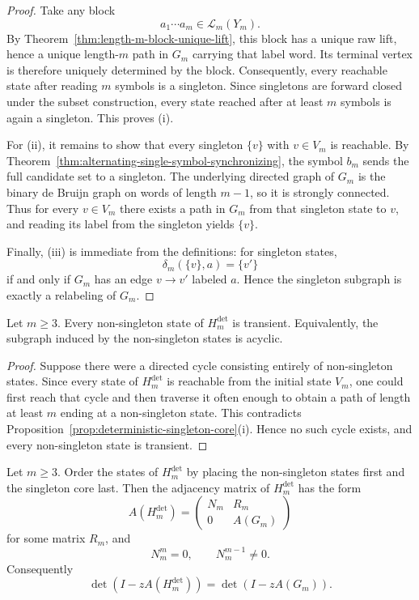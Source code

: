 \begin{proof}
Take any block
\[
a_1\cdots a_m\in\mathcal L_m(Y_m).
\]
By Theorem~\ref{thm:length-m-block-unique-lift}, this block has a unique raw
lift, hence a unique length-$m$ path in $G_m$ carrying that label word.  Its
terminal vertex is therefore uniquely determined by the block.  Consequently,
every reachable state after reading $m$ symbols is a singleton.  Since
singletons are forward closed under the subset construction, every state reached
after at least $m$ symbols is again a singleton.  This proves
\textup{(i)}.

For \textup{(ii)}, it remains to show that every singleton $\{v\}$ with
$v\in V_m$ is reachable.  By
Theorem~\ref{thm:alternating-single-symbol-synchronizing}, the symbol $b_m$
sends the full candidate set to a singleton.  The
underlying directed graph of $G_m$ is the binary de Bruijn graph on words of
length $m-1$, so it is strongly connected.  Thus for every $v\in V_m$ there
exists a path in $G_m$ from that singleton state to $v$, and reading its label
from the singleton yields $\{v\}$.

Finally, \textup{(iii)} is immediate from the definitions: for singleton states,
\[
\delta_m(\{v\},a)=\{v'\}
\]
if and only if $G_m$ has an edge $v\to v'$ labeled $a$.  Hence the singleton
subgraph is exactly a relabeling of $G_m$.
\end{proof}

\begin{proposition}
\label{prop:deterministic-ambiguity-transient}
Let $m\ge 3$.  Every non-singleton state of $H_m^{\mathrm{det}}$ is transient.
Equivalently, the subgraph induced by the non-singleton states is acyclic.
\end{proposition}

\begin{proof}
Suppose there were a directed cycle consisting entirely of non-singleton states.
Since every state of $H_m^{\mathrm{det}}$ is reachable from the initial state
$V_m$, one could first reach that cycle and then traverse it often enough to
obtain a path of length at least $m$ ending at a non-singleton state.  This
contradicts Proposition~\ref{prop:deterministic-singleton-core}\textup{(i)}.
Hence no such cycle exists, and every non-singleton state is transient.
\end{proof}

\begin{proposition}
\label{prop:ambiguity-shell-nilpotency}
Let $m\ge 3$.  Order the states of $H_m^{\mathrm{det}}$ by placing the
non-singleton states first and the singleton core last.  Then the adjacency
matrix of $H_m^{\mathrm{det}}$ has the form
\[
A(H_m^{\mathrm{det}})
=
\begin{pmatrix}
N_m & R_m\\
0 & A(G_m)
\end{pmatrix}
\]
for some matrix $R_m$, and
\[
N_m^m=0,
\qquad
N_m^{m-1}\neq 0.
\]
Consequently
\[
\det(I-zA(H_m^{\mathrm{det}}))=\det(I-zA(G_m)).
\]
\end{proposition}


